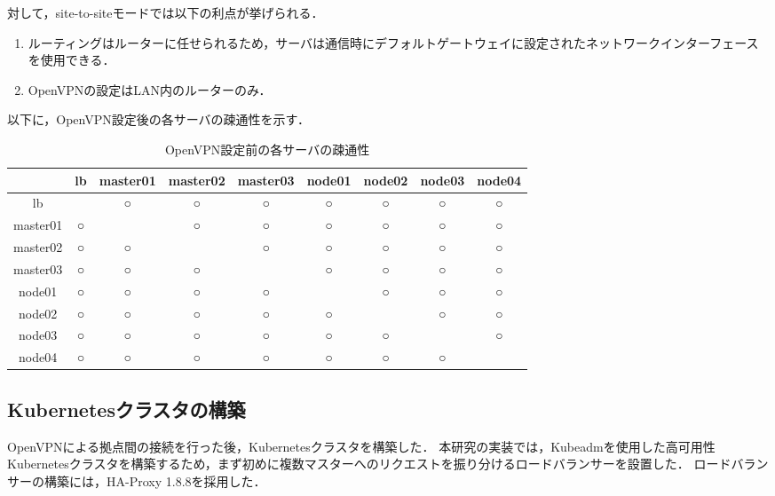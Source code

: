 対して，site-to-siteモードでは以下の利点が挙げられる．

\begin{enumerate}
  \item ルーティングはルーターに任せられるため，サーバは通信時にデフォルトゲートウェイに設定されたネットワークインターフェースを使用できる．
  \item OpenVPNの設定はLAN内のルーターのみ．
\end{enumerate}

以下に，OpenVPN設定後の各サーバの疎通性を示す．

\begin{table}[htb]
  \begin{center}
    \caption{OpenVPN設定前の各サーバの疎通性}
    \begin{tabular}{|c|c|c|c|c|c|c|c|c|} \hline
      & lb & master01 & master02 & master03 & node01 & node02 & node03 & node04 \\ \hline
      lb & \ & ○ & ○ & ○ & ○ & ○ & ○ & ○ \\ \hline
      master01 & ○ & \ & ○ & ○ & ○ & ○ & ○ & ○ \\ \hline
      master02 & ○ & ○ & \ & ○ & ○ & ○ & ○ & ○ \\ \hline
      master03 & ○ & ○ & ○ & \ & ○ & ○ & ○ & ○ \\ \hline
      node01 & ○ & ○ & ○ & ○ & \ & ○ & ○ & ○ \\ \hline
      node02 & ○ & ○ & ○ & ○ & ○ & \ & ○ & ○ \\ \hline
      node03 & ○ & ○ & ○ & ○ & ○ & ○ & \ & ○ \\ \hline
      node04 & ○ & ○ & ○ & ○ & ○ & ○ & ○ & \ \\ \hline
    \end{tabular}
  \end{center}
\end{table}

\subsection{Kubernetesクラスタの構築}

OpenVPNによる拠点間の接続を行った後，Kubernetesクラスタを構築した．
本研究の実装では，Kubeadmを使用した高可用性Kubernetesクラスタを構築するため，まず初めに複数マスターへのリクエストを振り分けるロードバランサーを設置した．
ロードバランサーの構築には，HA-Proxy 1.8.8を採用した．\\

